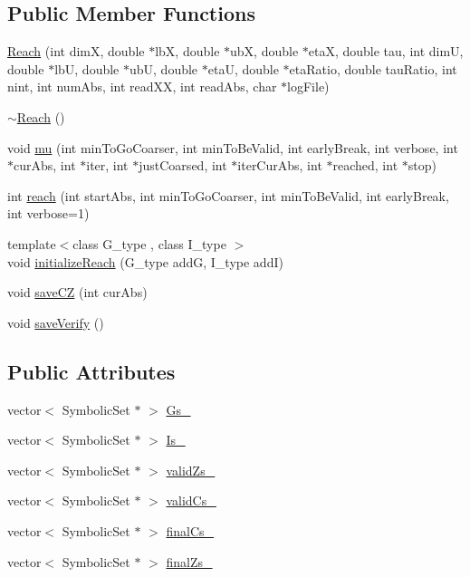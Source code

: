 \subsection*{Public Member Functions}
\begin{DoxyCompactItemize}
\item 
\hyperlink{classscots_1_1Reach_ac61b7e746e55013c48de47eb3dc00ff7}{Reach} (int dimX, double $\ast$lbX, double $\ast$ubX, double $\ast$etaX, double tau, int dimU, double $\ast$lbU, double $\ast$ubU, double $\ast$etaU, double $\ast$eta\+Ratio, double tau\+Ratio, int nint, int num\+Abs, int read\+XX, int read\+Abs, char $\ast$log\+File)
\item 
\hyperlink{classscots_1_1Reach_a05425187c9015158f5495904c34342d0}{$\sim$\+Reach} ()
\item 
void \hyperlink{classscots_1_1Reach_a6787ba675345efb35d5b5dcd720cf389}{mu} (int min\+To\+Go\+Coarser, int min\+To\+Be\+Valid, int early\+Break, int verbose, int $\ast$cur\+Abs, int $\ast$iter, int $\ast$just\+Coarsed, int $\ast$iter\+Cur\+Abs, int $\ast$reached, int $\ast$stop)
\item 
int \hyperlink{classscots_1_1Reach_aae2c35919866a8235f822542a4bb3dfe}{reach} (int start\+Abs, int min\+To\+Go\+Coarser, int min\+To\+Be\+Valid, int early\+Break, int verbose=1)
\item 
{\footnotesize template$<$class G\+\_\+type , class I\+\_\+type $>$ }\\void \hyperlink{classscots_1_1Reach_ad49c77293343ad0ce4f36c9deee45f00}{initialize\+Reach} (G\+\_\+type addG, I\+\_\+type addI)
\item 
void \hyperlink{classscots_1_1Reach_ada9bf5083703b737976effb85de28c4b}{save\+CZ} (int cur\+Abs)
\item 
void \hyperlink{classscots_1_1Reach_ab9c39fa2834a0a8f08abe48838ae1c41}{save\+Verify} ()
\end{DoxyCompactItemize}
\subsection*{Public Attributes}
\begin{DoxyCompactItemize}
\item 
vector$<$ Symbolic\+Set $\ast$ $>$ \hyperlink{classscots_1_1Reach_af3fd5ddf192d97ec5dc650ad57e6c485}{Gs\+\_\+}
\item 
vector$<$ Symbolic\+Set $\ast$ $>$ \hyperlink{classscots_1_1Reach_a3366767e4a2edbb8c683e0a74a709b10}{Is\+\_\+}
\item 
vector$<$ Symbolic\+Set $\ast$ $>$ \hyperlink{classscots_1_1Reach_a2f484ac1e7bd5a451b409c373149369c}{valid\+Zs\+\_\+}
\item 
vector$<$ Symbolic\+Set $\ast$ $>$ \hyperlink{classscots_1_1Reach_ade8c2425a8ff0cc7d7ed017412b6aa29}{valid\+Cs\+\_\+}
\item 
vector$<$ Symbolic\+Set $\ast$ $>$ \hyperlink{classscots_1_1Reach_a42e41806d2c3308e41de9b21afae2206}{final\+Cs\+\_\+}
\item 
vector$<$ Symbolic\+Set $\ast$ $>$ \hyperlink{classscots_1_1Reach_ae607710b3da219ec741f8609f870bafd}{final\+Zs\+\_\+}
\end{DoxyCompactItemize}


